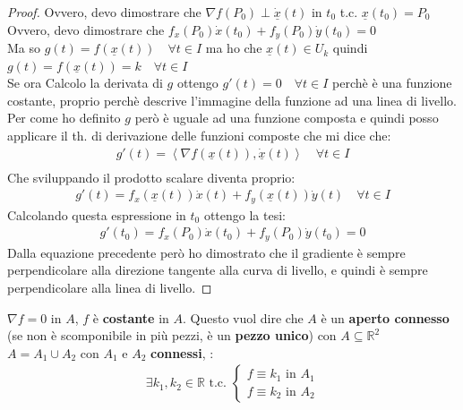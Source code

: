 \documentclass[a4paper, oneside]{article}
\newcommand\R{\mathbb{R}}
\begin{document}
\begin{proof}
  Ovvero, devo dimostrare che $\nabla f(P_0) \perp \underline{\dot{x}}(t)$ in $t_0$ t.c. $\underline{x}(t_0) = P_0$\\
  Ovvero, devo dimostrare che $f_x(P_0) \dot{x}(t_0) + f_y(P_0) \dot{y}(t_0) = 0$\\
  Ma so $g(t) = f(\underline{x}(t)) \quad \forall t \in I$ ma ho che $\underline{x}(t) \in U_k$ quindi $g(t) = f(\underline{x}(t)) = k \quad \forall t \in I$\\
  Se ora Calcolo la derivata di $g$ ottengo $g'(t) = 0 \quad \forall t \in I$ perchè è una funzione costante, proprio perchè descrive l'immagine della funzione ad una linea di livello.\\ 
  Per come ho definito $g$ però è uguale ad una funzione composta e quindi posso applicare il th. di derivazione delle funzioni composte che mi dice che:
  \begin{gather*}
    g'(t) = \left\langle \nabla f(\underline{x}(t)) , \underline{\dot{x}}(t)\right\rangle  \quad \forall t \in I\\
  \end{gather*}
  Che sviluppando il prodotto scalare diventa proprio:
  \begin{gather*}
    g'(t) = f_x(\underline{x}(t)) \dot{x}(t) + f_y(\underline{x}(t)) \dot{y}(t) \quad \forall t \in I
  \end{gather*}
  Calcolando questa espressione in $t_0$ ottengo la tesi:
  \begin{gather*}
    g'(t_0) = f_x(P_0) \dot{x}(t_0) + f_y(P_0) \dot{y}(t_0) = 0
  \end{gather*}
  Dalla equazione precedente però ho dimostrato che il gradiente è sempre perpendicolare alla direzione tangente alla curva di livello, e quindi è sempre perpendicolare alla linea di livello.
\end{proof}
\begin{theorem}
   $\nabla f = 0$ in $A$,  $f$ è \textbf{costante} in $A$.
  Questo vuol dire che  $A$ è un \textbf{aperto connesso} (se non è scomponibile in più pezzi, è un \textbf{pezzo unico}) con $A \subseteq \R^2$\\
   $A = A_1 \cup A_2$ con $A_1$ e $A_2$ \textbf{connessi}, :\\
  \begin{gather*}
    \exists k_1, k_2 \in \R \text{ t.c. } 
    \begin{cases}
      f \equiv k_1 \text{ in } A_1\\
      f \equiv k_2 \text{ in } A_2
    \end{cases}
  \end{gather*}
\end{theorem}
\end{document}

